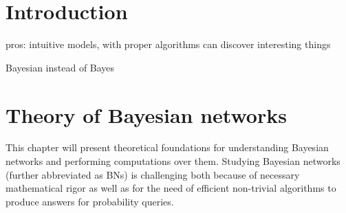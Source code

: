 \documentclass[english,cover]{fitthesis} %
\newcommand{\todo}[1]{{\color{red} #1}}
\begin{document}
  \maketitle
  \tableofcontents
  


  









\chapter{Introduction}
\todo{pros: intuitive models, with proper algorithms can discover interesting things}

\todo{Bayesian instead of Bayes}


































\chapter{Theory of Bayesian networks}
This chapter will present theoretical foundations for understanding Bayesian networks and performing computations over them. Studying Bayesian networks (further abbreviated as BNs) is challenging both because of necessary mathematical rigor as well as for the need of efficient non-trivial algorithms to produce answers for probability queries.
\end{document}
